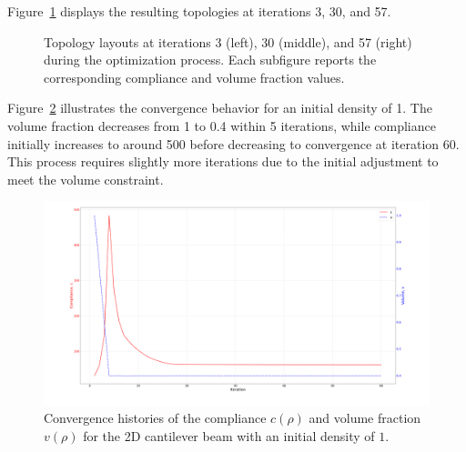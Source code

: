 \documentclass[mathpazo]{cicp}
\begin{document}
Figure~\ref{fig:canti_04_all} displays the resulting topologies at iterations 3, 30, and 57.
\begin{figure}[htb]
	\centering
	\caption{Topology layouts at iterations 3 (left), 30 (middle), and 57 (right) during the optimization process. Each subfigure reports the corresponding compliance and volume fraction values.}
	\label{fig:canti_04_all}
\end{figure}

Figure~\ref{fig:canti_1_convergence} illustrates the convergence behavior for an initial density of 1. The volume fraction decreases from 1 to 0.4 within 5 iterations, while compliance initially increases to around 500 before decreasing to convergence at iteration 60. This process requires slightly more iterations due to the initial adjustment to meet the volume constraint.
\begin{figure}[htb]
	\centering
	\includegraphics[width=1.0\textwidth]{figures/cantilever_2d_1_convergence.png}
	\caption{Convergence histories of the compliance $c(\rho)$ and volume fraction $v(\rho)$ for the 2D cantilever beam with an initial density of $1$.}
	\label{fig:canti_1_convergence}
\end{figure}
\end{document}
